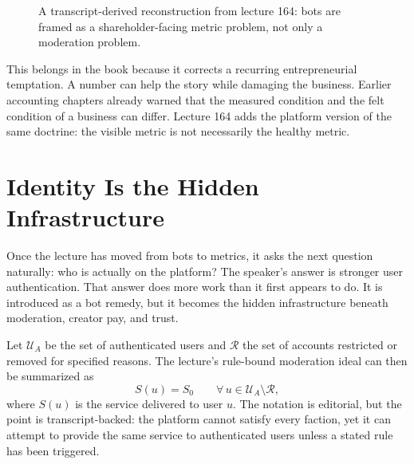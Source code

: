 \documentclass[11pt,oneside]{book}
\begin{document}
\begin{figure}
\centering
{}
\caption{A transcript-derived reconstruction from lecture 164: bots are framed as a shareholder-facing metric problem, not only a moderation problem.}
\end{figure}

This belongs in the book because it corrects a recurring entrepreneurial temptation. A number can help the story while damaging the business. Earlier accounting chapters already warned that the measured condition and the felt condition of a business can differ. Lecture 164 adds the platform version of the same doctrine: the visible metric is not necessarily the healthy metric.

\section{Identity Is the Hidden Infrastructure}

Once the lecture has moved from bots to metrics, it asks the next question naturally: who is actually on the platform? The speaker's answer is stronger user authentication. That answer does more work than it first appears to do. It is introduced as a bot remedy, but it becomes the hidden infrastructure beneath moderation, creator pay, and trust.

Let \(\mathcal U_A\) be the set of authenticated users and \(\mathcal R\) the set of accounts restricted or removed for specified reasons. The lecture's rule-bound moderation ideal can then be summarized as
\[
S(u)=S_0
\qquad
\forall\,u\in \mathcal U_A\setminus \mathcal R,
\]
where \(S(u)\) is the service delivered to user \(u\). The notation is editorial, but the point is transcript-backed: the platform cannot satisfy every faction, yet it can attempt to provide the same service to authenticated users unless a stated rule has been triggered.
\end{document}
